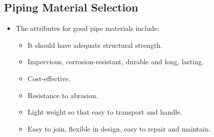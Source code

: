 \subsection{Piping Material Selection}
\begin{itemize}
\item The attributes for good pipe materials include:
\begin{itemize}
\item It should have adequate structural strength.

\item Impervious, corrosion-resistant, durable and long, lasting.

\item Cost-effective.

\item Resistance to abrasion.

\item Light weight so that easy to transport and handle.

\item Easy to join, flexible in design, easy to repair and maintain.


\end{itemize}
\end{itemize}
